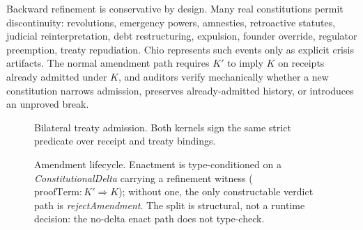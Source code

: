 Backward refinement is conservative by design. Many real constitutions permit discontinuity: revolutions, emergency powers, amnesties, retroactive statutes, judicial reinterpretation, debt restructuring, expulsion, founder override, regulator preemption, treaty repudiation. Chio represents such events only as explicit crisis artifacts. The normal amendment path requires $K'$ to imply $K$ on receipts already admitted under $K$, and auditors verify mechanically whether a new constitution narrows admission, preserves already-admitted history, or introduces an unproved break.

\begin{figure}
  \centering
  \resizebox{\columnwidth}{!}{}
  \caption{Bilateral treaty admission. Both kernels sign the same strict predicate over receipt and treaty bindings.}
  \label{fig:treaty}
\end{figure}

\begin{figure}
  \centering
  \resizebox{\columnwidth}{!}{}
  \caption{Amendment lifecycle. Enactment is type-conditioned on a \emph{ConstitutionalDelta} carrying a refinement witness ($\text{proofTerm}:K'\Rightarrow K$); without one, the only constructable verdict path is \emph{rejectAmendment}. The split is structural, not a runtime decision: the no-delta enact path does not type-check.}
  \label{fig:amendment}
\end{figure}
